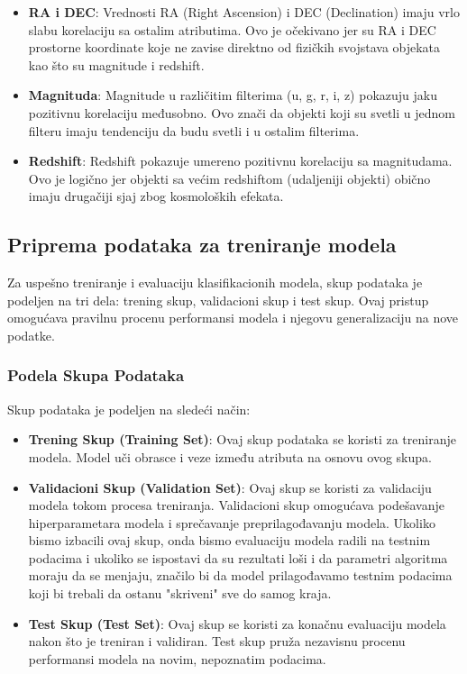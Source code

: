 \documentclass[a4paper,12pt]{article}
\begin{document}
\begin{itemize}
    \item \textbf{RA i DEC}: Vrednosti RA (Right Ascension) i DEC (Declination) imaju vrlo slabu korelaciju sa ostalim atributima. Ovo je očekivano jer su RA i DEC prostorne koordinate koje ne zavise direktno od fizičkih svojstava objekata kao što su magnitude i redshift.
    \item \textbf{Magnituda}: Magnitude u različitim filterima (u, g, r, i, z) pokazuju jaku pozitivnu korelaciju međusobno. Ovo znači da objekti koji su svetli u jednom filteru imaju tendenciju da budu svetli i u ostalim filterima.
    \item \textbf{Redshift}: Redshift pokazuje umereno pozitivnu korelaciju sa magnitudama. Ovo je logično jer objekti sa većim redshiftom (udaljeniji objekti) obično imaju drugačiji sjaj zbog kosmoloških efekata.
\end{itemize}

\subsection{Priprema podataka za treniranje modela}
Za uspešno treniranje i evaluaciju klasifikacionih modela, skup podataka je podeljen na tri dela: trening skup, validacioni skup i test skup. Ovaj pristup omogućava pravilnu procenu performansi modela i njegovu generalizaciju na nove podatke.

\subsubsection{Podela Skupa Podataka}
Skup podataka je podeljen na sledeći način:
\begin{itemize}
    \item \textbf{Trening Skup (Training Set)}: Ovaj skup podataka se koristi za treniranje modela. Model uči obrasce i veze između atributa na osnovu ovog skupa.
    \item \textbf{Validacioni Skup (Validation Set)}: Ovaj skup se koristi za validaciju modela tokom procesa treniranja. Validacioni skup omogućava podešavanje hiperparametara modela i sprečavanje preprilagođavanju modela. Ukoliko bismo izbacili ovaj skup, onda bismo evaluaciju modela radili na testnim podacima i ukoliko se ispostavi da su rezultati loši i da parametri algoritma moraju da se menjaju, značilo bi da model prilagođavamo testnim podacima koji bi trebali da ostanu "skriveni" sve do samog kraja.
    \item \textbf{Test Skup (Test Set)}: Ovaj skup se koristi za konačnu evaluaciju modela nakon što je treniran i validiran. Test skup pruža nezavisnu procenu performansi modela na novim, nepoznatim podacima.
\end{itemize}
\end{document}
